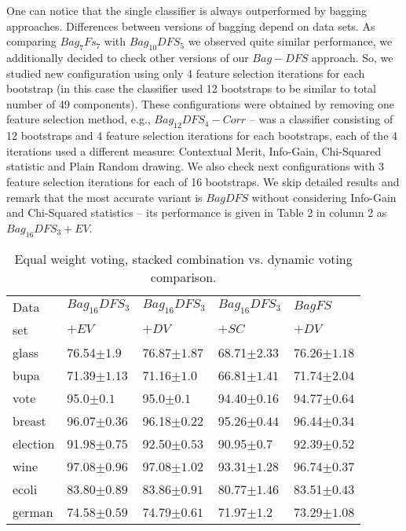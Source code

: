 \documentclass[runningheads]{llncs}
\begin{document}
One can notice that the single classifier is always outperformed by bagging
approaches. Differences between  versions of bagging depend on data sets. As
comparing $Bag_7Fs_7$ with $Bag_{10}DFS_5$ we observed quite similar
performance, we additionally decided to check  other versions of our
$Bag-DFS$ approach. So, we studied new configuration using only 4 feature
selection iterations for each bootstrap (in this case the classifier used 12
bootstraps to be similar to total number of 49 components). These
configurations were obtained by removing one feature selection method, e.g.,
$Bag_{12}DFS_4-Corr$ -- was a classifier consisting of 12 bootstraps and 4
feature selection iterations for each bootstraps, each of the 4 iterations
used a different measure: Contextual Merit, Info-Gain, Chi-Squared statistic
and Plain Random drawing. We also check next configurations with 3 feature
selection iterations for each of 16 bootstraps. We skip detailed results and
remark that the most accurate variant is $BagDFS$ without considering
Info-Gain and Chi-Squared statistics -- its performance is given in Table 2
in column 2 as $Bag_{16}DFS_{3}+EV$.


 \begin{table}
\centering \caption{Equal weight voting, stacked combination vs. dynamic
voting comparison.} \label{tab:voting}
\begin{tabular}{lllll}\hline
Data &$Bag_{16}DFS_{3}$ & $Bag_{16}DFS_{3}$ & $Bag_{16}DFS_{3}$ & $BagFS$\\
 set & $+EV$ & $+DV$ & $+SC$ & $+DV$ \\ \hline
glass&76.54\scriptsize{$\pm1.9$} &76.87\scriptsize{$\pm1.87$}&
68.71\scriptsize{$\pm2.33$} & 76.26\scriptsize{$\pm1.18$}\\
bupa&71.39\scriptsize{$\pm1.13$}&71.16\scriptsize{$\pm1.0$}&
66.81\scriptsize{$\pm1.41$}& 71.74\scriptsize{$\pm2.04$}\\
vote&95.0\scriptsize{$\pm0.1$}&95.0\scriptsize{$\pm0.1$}&
94.40\scriptsize{$\pm0.16$}& 94.77\scriptsize{$\pm0.64$}\\
 breast&96.07\scriptsize{$\pm0.36$}&96.18\scriptsize{$\pm0.22$}& 95.26\scriptsize{$\pm0.44$}
 &96.44\scriptsize{$\pm0.34$}\\
 election&91.98\scriptsize{$\pm0.75$}&92.50\scriptsize{$\pm0.53$}& 90.95\scriptsize{$\pm0.7$} &
 92.39\scriptsize{$\pm0.52$}\\
 wine&97.08\scriptsize{$\pm0.96$}&97.08\scriptsize{$\pm1.02$}& 93.31\scriptsize{$\pm1.28$}
 &96.74\scriptsize{$\pm0.37$}\\
 ecoli&83.80\scriptsize{$\pm0.89$}&83.86\scriptsize{$\pm0.91$}&80.77\scriptsize{$\pm1.46$}
 &83.51\scriptsize{$\pm0.43$}\\
 german&74.58\scriptsize{$\pm0.59$}&74.79\scriptsize{$\pm0.61$}&71.97\scriptsize{$\pm1.2$}
 &73.29\scriptsize{$\pm1.08$}\\ \hline
\end{tabular}
\end{table}
\end{document}
